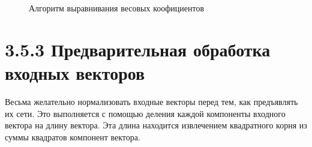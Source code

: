 \documentclass[14pt,a4paper]{extreport}
\begin{document}
\begin{figure}[h!]
\caption{Алгоритм выравнивания весовых коофициентов}
\end{figure}  

            \section*{\normalsize\hspace{4ex}3.5.3 Предварительная обработка входных векторов}           
   \hspace {4ex} Весьма желательно нормализовать входные векторы перед тем, как предъявлять их сети. Это выполняется с помощью деления каждой компоненты входного вектора на длину вектора. Эта длина находится извлечением квадратного корня из суммы квадратов компонент вектора. \
   
\end{document}
